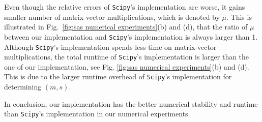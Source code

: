 Even though the relative errors of \texttt{Scipy}'s implementation are worse, it gains smaller number of matrix-vector multiplications, which is denoted by $\mu$. This is illustrated in Fig.\ \ref{fig:sas numerical experiments}(b) and (d), that the ratio of $\mu$ between our implementation and \texttt{Scipy}'s implementation is always larger than 1. Although \texttt{Scipy}'s implementation spends less time on matrix-vector multiplications, the total runtime of \texttt{Scipy}'s implementation is larger than the one of our implementation, see Fig. \ref{fig:sas numerical experiments}(b) and (d). This is due to the larger runtime overhead of \texttt{Scipy}'s implementation for determining $(m,s)$. 

In conclusion, our implementation has the better numerical stability and runtime than \texttt{Scipy}'s implementation in our numerical experiments. 



